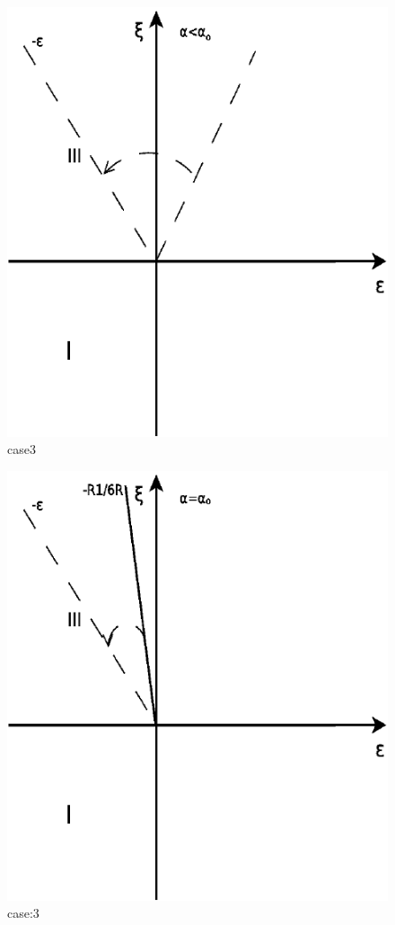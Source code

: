 \documentclass[12pt]{article}
\begin{document}
\begin{figure}
 \includegraphics{./Diagram6.pdf}
 \caption{case3}
 \label{fig:5}
\end{figure}

\begin{figure}
 \includegraphics{./Diagram7.pdf}
 \caption{case:3}
 \label{fig:6}
\end{figure}
\end{document}
